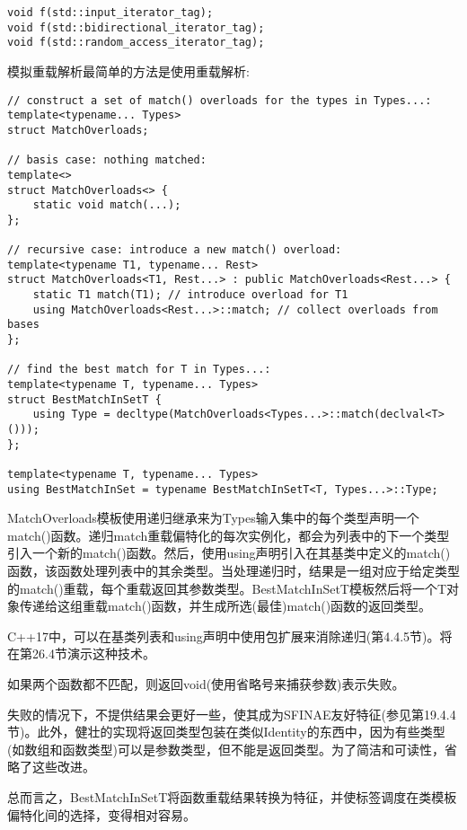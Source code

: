 \begin{lstlisting}[style=styleCXX]
void f(std::input_iterator_tag);
void f(std::bidirectional_iterator_tag);
void f(std::random_access_iterator_tag);
\end{lstlisting}

模拟重载解析最简单的方法是使用重载解析:

\begin{lstlisting}[style=styleCXX]
// construct a set of match() overloads for the types in Types...:
template<typename... Types>
struct MatchOverloads;

// basis case: nothing matched:
template<>
struct MatchOverloads<> {
	static void match(...);
};

// recursive case: introduce a new match() overload:
template<typename T1, typename... Rest>
struct MatchOverloads<T1, Rest...> : public MatchOverloads<Rest...> {
	static T1 match(T1); // introduce overload for T1
	using MatchOverloads<Rest...>::match; // collect overloads from bases
};

// find the best match for T in Types...:
template<typename T, typename... Types>
struct BestMatchInSetT {
	using Type = decltype(MatchOverloads<Types...>::match(declval<T>()));
};

template<typename T, typename... Types>
using BestMatchInSet = typename BestMatchInSetT<T, Types...>::Type;
\end{lstlisting}

MatchOverloads模板使用递归继承来为Types输入集中的每个类型声明一个match()函数。递归match重载偏特化的每次实例化，都会为列表中的下一个类型引入一个新的match()函数。然后，使用using声明引入在其基类中定义的match()函数，该函数处理列表中的其余类型。当处理递归时，结果是一组对应于给定类型的match()重载，每个重载返回其参数类型。BestMatchInSetT模板然后将一个T对象传递给这组重载match()函数，并生成所选(最佳)match()函数的返回类型。

\begin{tcolorbox}[colback=webgreen!5!white,colframe=webgreen!75!black]
\hspace*{0.75cm}C++17中，可以在基类列表和using声明中使用包扩展来消除递归(第4.4.5节)。将在第26.4节演示这种技术。
\end{tcolorbox}

如果两个函数都不匹配，则返回void(使用省略号来捕获参数)表示失败。

\begin{tcolorbox}[colback=webgreen!5!white,colframe=webgreen!75!black]
\hspace*{0.75cm}失败的情况下，不提供结果会更好一些，使其成为SFINAE友好特征(参见第19.4.4节)。此外，健壮的实现将返回类型包装在类似Identity的东西中，因为有些类型(如数组和函数类型)可以是参数类型，但不能是返回类型。为了简洁和可读性，省略了这些改进。
\end{tcolorbox}

总而言之，BestMatchInSetT将函数重载结果转换为特征，并使标签调度在类模板偏特化间的选择，变得相对容易。










